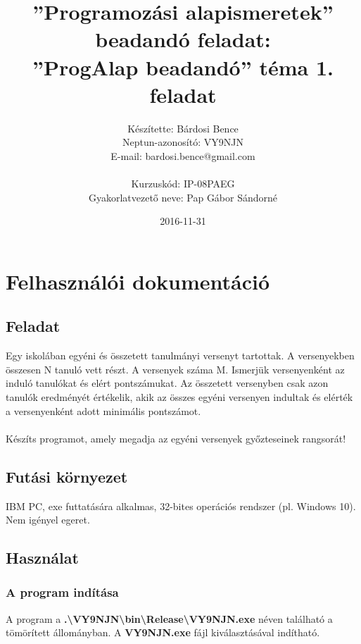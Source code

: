\documentclass[a4paper]{article}
\title{”Programozási alapismeretek”\\ beadandó feladat:\\ ”ProgAlap beadandó” téma 1. feladat}
\date{2016-11-31}
\author{Készítette: Bárdosi Bence\\ Neptun-azonosító: VY9NJN\\ E-mail: bardosi.bence@gmail.com\\\\ Kurzuskód: IP-08PAEG\\ Gyakorlatvezető neve: Pap Gábor Sándorné}
\begin{document}
  \maketitle
  \newpage

  \tableofcontents
  \newpage

  \section{Felhasználói dokumentáció}
    \subsection{Feladat}
      Egy iskolában egyéni és összetett tanulmányi versenyt tartottak.
      A versenyekben összesen N tanuló vett részt. A versenyek száma M.
      Ismerjük versenyenként az induló tanulókat és elért pontszámukat.
      Az összetett versenyben csak azon tanulók eredményét értékelik,
      akik az összes egyéni versenyen indultak és elérték a versenyenként adott minimális pontszámot.
      \\
      \\ Készíts programot, amely megadja az egyéni versenyek győzteseinek rangsorát!
    \subsection{Futási környezet}
      IBM PC, exe futtatására alkalmas, 32-bites operációs rendszer (pl. Windows 10). Nem igényel egeret.
    \subsection{Használat}
      \subsubsection{A program indítása}
        A program a \textbf{.\textbackslash VY9NJN\textbackslash bin\textbackslash Release\textbackslash VY9NJN.exe} néven található a tömörített állományban. A \textbf{VY9NJN.exe} fájl kiválasztásával indítható.
\end{document}
